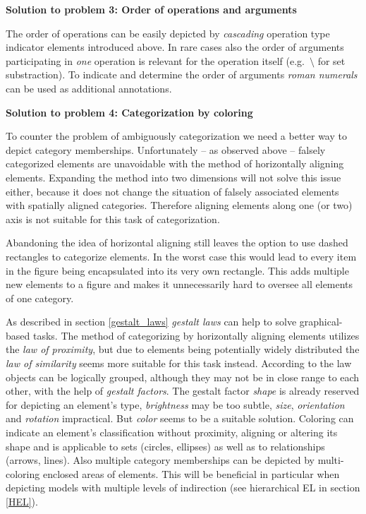 \documentclass[twoside, openright, 12pt]{book}
\begin{document}
\vspace{2mm}
\noindent
\textbf{Solution to problem 3: Order of operations and arguments}
\vspace{1mm}

\noindent
The order of operations can be easily depicted by \textit{cascading} operation type indicator elements introduced above.
In rare cases also the order of arguments participating in \textit{one} operation is relevant for the operation itself (e.g.~$\setminus$ for set substraction).
To indicate and determine the order of arguments \textit{roman numerals} can be used as additional annotations.



\vspace{4mm}
\noindent
\textbf{Solution to problem 4: Categorization by coloring}
\vspace{1mm}

\noindent
To counter the problem of ambiguously categorization we need a better way to depict category memberships.
Unfortunately -- as observed above -- falsely categorized elements are unavoidable with the method of horizontally aligning elements.
Expanding the method into two dimensions will not solve this issue either, because it does not change the situation of falsely associated elements with spatially aligned categories.
Therefore aligning elements along one (or two) axis is not suitable for this task of categorization.

Abandoning the idea of horizontal aligning still leaves the option to use dashed rectangles to categorize elements.
In the worst case this would lead to every item in the figure being encapsulated into its very own rectangle.
This adds multiple new elements to a figure and makes it unnecessarily hard to oversee all elements of one category.

As described in section \ref{gestalt_laws} \textit{gestalt laws} can help to solve graphical-based tasks.
The method of categorizing by horizontally aligning elements utilizes the \textit{law of proximity}, but due to elements being potentially widely distributed the \textit{law of similarity} seems more suitable for this task instead.
According to the law objects can be logically grouped, although they may not be in close range to each other, with the help of \textit{gestalt factors}.
The gestalt factor \textit{shape} is already reserved for depicting an element's type, \textit{brightness} may be too subtle, \textit{size}, \textit{orientation} and \textit{rotation} impractical.
But \textit{color} seems to be a suitable solution.
Coloring can indicate an element's classification without proximity, aligning or altering its shape and is applicable to sets (circles, ellipses) as well as to relationships (arrows, lines).
Also multiple category memberships can be depicted by multi-coloring enclosed areas of elements.
This will be beneficial in particular when depicting models with multiple levels of indirection (see hierarchical EL in section \ref{HEL}).
\end{document}
